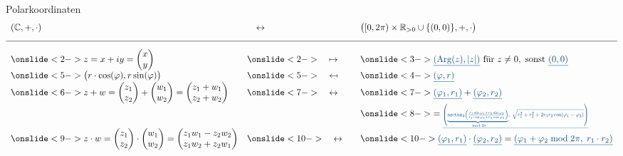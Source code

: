 \begin{frame}{Polarkoordinaten}
  \begin{equation*}
    \begin{array}{lll}
      (\C,+,\cdot) & \quad  \leftrightarrow \quad & \big([0,2\pi) \times \R_{>0}\cup \{(0,0)\},+,\cdot \big) \\
  \noalign{\vspace{0.3cm}} \hline \noalign{\vspace{0.3cm}} 
     \onslide<2->{z=x+iy=\begin{pmatrix}x \\ y  \end{pmatrix}}
        & \onslide<2->{\quad \mapsto \quad}
        & \onslide<3->{\polar{\Arg(z),|z|} \text{ für }z\neq 0, \text{ sonst }\polar{0,0}}\\[0.2cm]
      \onslide<5->{\big(r\cdot \cos(\phi),r\sin(\phi) \big)}
        & \onslide<5->{\quad \mapsfrom \quad}
        & \onslide<4->{\polar{\phi,r}}\\
      \onslide<6->{z+w=\begin{pmatrix}z_1 \\ z_2  \end{pmatrix}+\begin{pmatrix}w_1 \\ w_2  \end{pmatrix}=\begin{pmatrix}z_1+w_1 \\ z_2+w_2  \end{pmatrix}}
        & \onslide<7->{\quad \leftrightarrow \quad}
        & \onslide<7->{\polar{\phi_1,r_1}+\polar{\phi_2,r_2}}\\
      & & \onslide<8->{=\scalemath{0.6}{\polar{\underbrace{\arctan_2\!\left(\tfrac{r_1\sin\varphi_1+r_2\sin\varphi_2}
                        {r_1\cos\varphi_1+r_2\cos\varphi_2}\right)}_{\mod 2\pi }
   ,\; \sqrt{r_1^2+r_2^2+2r_1 r_2\cos(\varphi_1-\varphi_2)}
    }}}\\[0.2cm]
      \onslide<9->{z\cdot w= \begin{pmatrix}z_1 \\ z_2  \end{pmatrix}\cdot \begin{pmatrix}w_1 \\ w_2  \end{pmatrix}=\begin{pmatrix}z_1w_1-z_2w_2 \\ z_1w_2+z_2w_1  \end{pmatrix}}
        & \onslide<10->{\quad \leftrightarrow \quad}
        & \onslide<10->{\polar{\phi_1,r_1}\cdot \polar{\phi_2,r_2}= \polar{\phi_1+\phi_2 \bmod 2\pi,\;r_1\cdot r_2}}
    \end{array}
  \end{equation*}


\end{frame}

